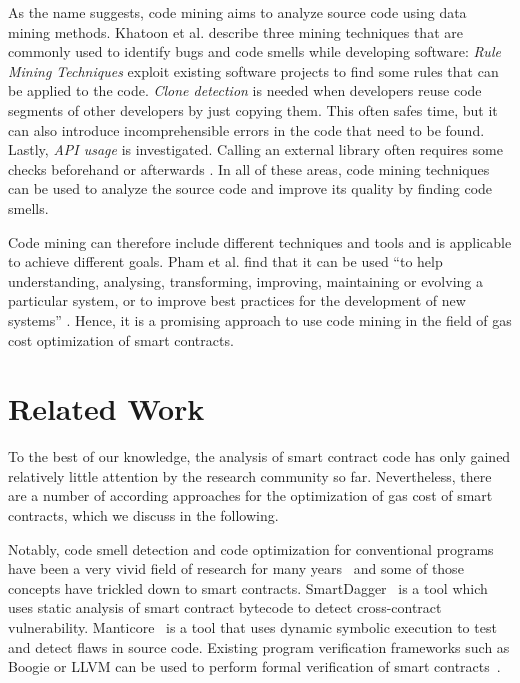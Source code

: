 \documentclass[10pt,conference]{IEEEtran}
\begin{document}
	As the name suggests, code mining aims to analyze source code using data mining methods. Khatoon et al. describe three mining techniques that are commonly used to identify bugs and code smells while developing software: \textit{Rule Mining Techniques} exploit existing software projects to find some rules that can be applied to the code. \textit{Clone detection} is needed when developers reuse code segments of other developers by just copying them. This often safes time, but it can also introduce incomprehensible errors in the code that need to be found. Lastly, \textit{API usage} is investigated. Calling an external library often requires some checks beforehand or afterwards \cite{khatoon}. In all of these areas, code mining techniques can be used to analyze the source code and improve its quality by finding code smells.
	
	Code mining can therefore include different techniques and tools and is applicable to achieve different goals. Pham et al. find that it can be used “to help understanding, analysing, transforming, improving, maintaining or evolving a particular system, or to improve best practices for the development of new systems” \cite{treemining}. Hence, it is a promising approach to use code mining in the field of gas cost optimization of smart contracts.
	
	\section{Related Work}
	\label{sec:related}
	
	To the best of our knowledge, the analysis of smart contract code has only gained relatively little attention by the research community so far. Nevertheless, there are a number of according approaches for the optimization of gas cost of smart contracts, which we discuss in the following. 
	
	Notably, code smell detection and code optimization for conventional programs have been a very vivid field of research for many years~\cite{codesmellmining} and some of those concepts have trickled down to smart contracts. SmartDagger~\cite{smartdagger} is a tool which uses static analysis of smart contract bytecode to detect cross-contract vulnerability. Manticore~\cite{manticore} is a tool that uses dynamic symbolic execution to test and detect flaws in source code. Existing program verification frameworks such as Boogie or LLVM can be used to perform formal verification of smart contracts~\cite{formalverification}.
	
\end{document}
